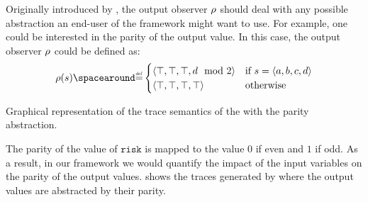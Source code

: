 \begin{example}
  Originally introduced by , the output observer $\rho$ should deal with any possible abstraction an end-user of the framework might want to use.
  For example, one could be interested in the parity of the output value.
  In this case, the output observer $\rho$ could be defined as:
  \[
  \outputobs(\defstate) \DefeQ \begin{cases}
    \langle \top, \top, \top, d \mod 2 \rangle & \text{if } \defstate = \langle a, b, c, d \rangle \\
    \langle \top, \top, \top, \top \rangle & \text{otherwise}
  \end{cases}
  \]
  \begin{marginfigure}[*-11]
    \centering
  \caption{Graphical representation of the trace semantics of the  with the parity abstraction.}
  \end{marginfigure}
  The parity of the value of $\texttt{risk}$ is mapped to the value $0$ if even and $1$ if odd.
  As a result, in our framework we would quantify the impact of the input variables on the parity of the output values.
   shows the traces generated by  where the output values are abstracted by their parity.
\end{example}



